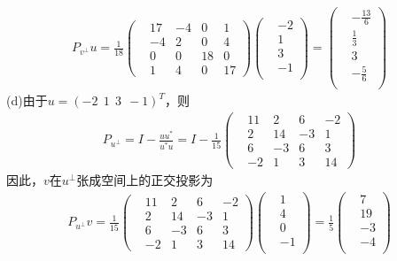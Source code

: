 \documentclass[UTF8,12pt, a4paper]{ctexart}
\begin{document}
\begin{align*}
    P_{v^\perp}u=\frac{1}{18}
    \left(
      \begin{matrix}
        &17 &-4 &0 &1 \\
        &-4 &2 &0 &4 \\
        &0 &0 &18 &0 \\
        &1 &4 &0 &17 
      \end{matrix}
    \right)
    \left(
      \begin{matrix}
        &-2 \\
        &1 \\
        &3 \\
        &-1 \\
      \end{matrix}
    \right)
    =\left(
      \begin{matrix}
        &-\frac{13}{6} \\
        &\frac{1}{3} \\
        &3 \\
        &-\frac{5}{6} \\
      \end{matrix}
    \right)
\end{align*}
(d)由于$u=(-2\ \ 1 \ \ 3 \ \ -1)^T$，则
\begin{align*}
  P_{u^\perp} =I - \frac{uu^*}{u^*u}
  = I - \frac{1}{15}
  \left(
    \begin{matrix}
      &11 &2 &6 &-2 \\
      &2 &14 &-3 &1 \\
      &6 &-3 &6 &3 \\
      &-2 &1 &3 &14 
    \end{matrix}
  \right)
\end{align*}
因此，$v$在$u^\perp$张成空间上的正交投影为
\begin{align*}
    P_{u^\perp}v=\frac{1}{15}
    \left(
      \begin{matrix}
        &11 &2 &6 &-2 \\
      &2 &14 &-3 &1 \\
      &6 &-3 &6 &3 \\
      &-2 &1 &3 &14 
      \end{matrix}
    \right)
    \left(
      \begin{matrix}
        &1 \\
        &4 \\
        &0 \\
        &-1 \\
      \end{matrix}
    \right)
    =\frac{1}{5}\left(
      \begin{matrix}
        &7 \\
        &19 \\
        &-3 \\
        &-4 \\
      \end{matrix}
    \right)
\end{align*}
\end{document}
